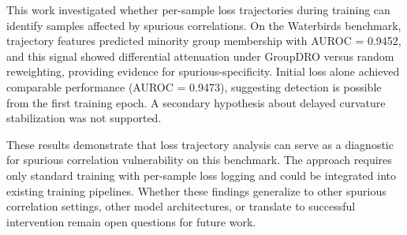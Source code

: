 
This work investigated whether per-sample loss trajectories during training can identify samples affected by spurious correlations. On the Waterbirds benchmark, trajectory features predicted minority group membership with AUROC = 0.9452, and this signal showed differential attenuation under GroupDRO versus random reweighting, providing evidence for spurious-specificity. Initial loss alone achieved comparable performance (AUROC = 0.9473), suggesting detection is possible from the first training epoch. A secondary hypothesis about delayed curvature stabilization was not supported.

These results demonstrate that loss trajectory analysis can serve as a diagnostic for spurious correlation vulnerability on this benchmark. The approach requires only standard training with per-sample loss logging and could be integrated into existing training pipelines. Whether these findings generalize to other spurious correlation settings, other model architectures, or translate to successful intervention remain open questions for future work.
